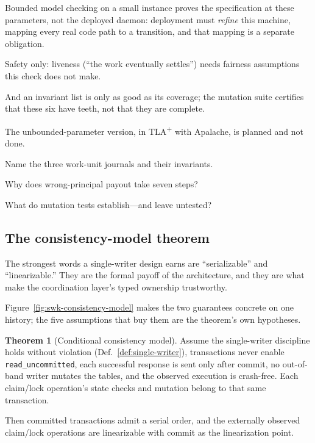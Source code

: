 \documentclass[11pt,a4paper]{article}
\theoremstyle{definition}
\newtheorem{theorem}{Theorem}[section]
\theoremstyle{remark}
\begin{document}
\begin{pdboundary}
\setlength{\parskip}{4pt plus 1pt}
Bounded model checking on a small instance proves the specification at these parameters,
not the deployed daemon: deployment must \emph{refine} this machine, mapping every real code
path to a transition, and that mapping is a separate obligation.

Safety only: liveness
(``the work eventually settles'') needs fairness assumptions this check does not make.

And
an invariant list is only as good as its coverage; the mutation suite certifies that these
six have teeth, not that they are complete.

The unbounded-parameter version, in TLA\textsuperscript{+}
with Apalache, is planned and not done.
\end{pdboundary}

\pdexercisepointer*{\ref{ex:swk-crimes}}{\ref{ex:swk-seventh-invariant}}{\pageref{ex:swk-crimes}}
\begin{pdrecitation}
\item Name the three work-unit journals and their invariants.
\item Why does wrong-principal payout take seven steps?
\item What do mutation tests establish---and leave untested?
\end{pdrecitation}


\subsection{The consistency-model theorem}

The strongest words a single-writer design earns are ``serializable'' and
``linearizable.'' They are the formal payoff of the architecture, and they are what
make the coordination layer's typed ownership trustworthy.

Figure~\ref{fig:swk-consistency-model} makes the two guarantees concrete on one
history; the five assumptions that buy them are the theorem's own hypotheses.



\begin{theorem}[Conditional consistency model]\label{thm:consistency}
\setlength{\parskip}{4pt plus 1pt}
Assume the single-writer discipline holds without violation (Def.~\ref{def:single-writer}), transactions never enable \texttt{read\_uncommitted}, each successful response is sent only after commit, no out-of-band writer mutates the tables, and the observed execution is crash-free. Each claim/lock operation's state checks and mutation belong to that same transaction.

Then committed transactions admit a serial order, and the externally observed
claim/lock operations are linearizable with commit as the linearization point.
\end{theorem}
\end{document}
